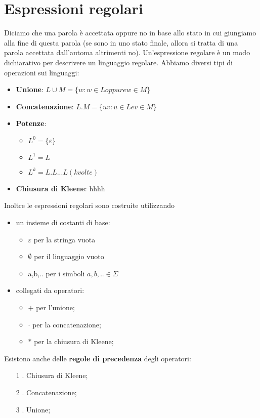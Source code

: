 \chapter{Espressioni regolari}
Diciamo che una parola è accettata oppure no in base allo stato in cui giungiamo alla
fine di questa parola (se sono in uno stato finale, allora si tratta di una parola accettata
dall'automa altrimenti no).
Un'espressione regolare è un modo dichiarativo per descrivere un linguaggio regolare.
Abbiamo diversi tipi di operazioni sui linguaggi:

\begin{itemize}
\item \textbf{Unione}: $L\cup M=\{w:w \in L oppure w \in M\}$
\item \textbf{Concatenazione}: $L.M=\{uv : u \in L e v \in M\}$
\item \textbf{Potenze}: 
	\begin{itemize}
	\item $L^{0}=\{\varepsilon\}$
	\item $L^{1}=L$   
	\item $L^{k}=L.L...L(k volte)$
	\end{itemize}
\item \textbf{Chiusura di Kleene}: hhhh
\end{itemize}

Inoltre le espressioni regolari sono costruite utilizzando 

\begin{itemize}
\item un insieme di costanti di base:
	\begin{itemize}
	\item $\varepsilon$ per la stringa vuota
	\item $\emptyset$ per il linguaggio vuoto
	\item a,b,.. per i simboli $a,b,..\in \Sigma$
	\end{itemize}
\item collegati da operatori:
	\begin{itemize}
	\item $+$ per l'unione;
	\item $\cdot$ per la concatenazione;
	\item $\ast$ per la chiusura di Kleene;
	\end{itemize}
\end{itemize}

Esistono anche delle \textbf{regole di precedenza} degli operatori:
\begin{itemize}
\item[1]. Chiusura di Kleene;
\item[2]. Concatenazione;
\item[3]. Unione;
\end{itemize}










